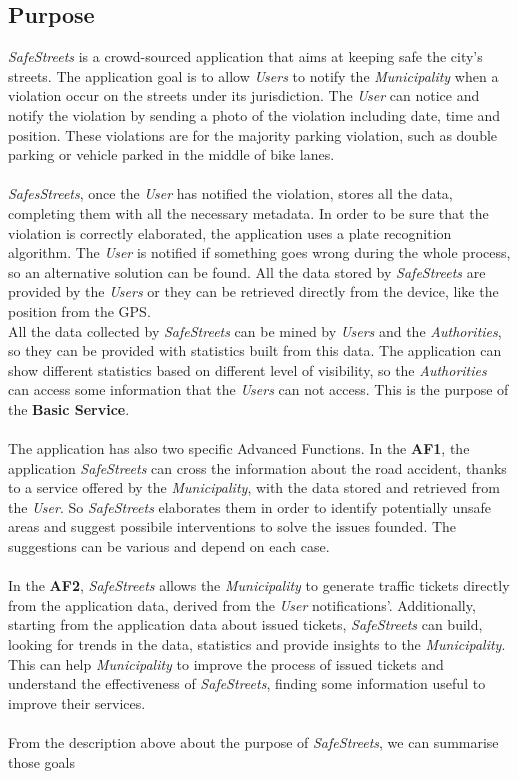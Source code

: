 \documentclass {article}
\begin{document}
	
	\subsection{Purpose}
	
	{\it SafeStreets} is a crowd-sourced application that aims at keeping safe the city's streets. The application goal is to allow {\it Users} to notify the {\it Municipality} when a violation occur on the streets under its jurisdiction. The {\it User} can notice and notify the violation by sending a photo of the violation including date, time and position. These violations are for the majority parking violation, such as double parking or vehicle parked in the middle of bike lanes. \\ \\
	{\it SafesStreets}, once the {\it User} has notified the violation, stores all the data, completing them with all the necessary metadata. In order to be sure that the violation is correctly elaborated, the application uses a plate recognition algorithm. The {\it User} is notified if something goes wrong during the whole process, so an alternative solution can be found. All the data stored by {\it SafeStreets} are provided by the {\it Users} or they can be retrieved directly from the device, like the position from the GPS.\\
	All the data collected by {\it SafeStreets} can be mined by {\it Users} and the {\it Authorities}, so they can be provided with statistics built from this data. The application can show different statistics based on different level of visibility, so the {\it Authorities} can access some information that the {\it Users} can not access. This is the purpose of the {\bf Basic Service}. \\ \\
	The application has also two specific Advanced Functions. In the {\bf AF1}, the application {\it SafeStreets} can cross the information about the road accident, thanks to a service offered by the {\it Municipality}, with the data stored and retrieved from the {\it User}. So {\it SafeStreets} elaborates them in order to identify potentially unsafe areas and suggest possibile interventions to solve the issues founded. The suggestions can be various and depend on each case. \\ \\
	In the   {\bf AF2}, {\it SafeStreets} allows the {\it Municipality} to generate traffic tickets directly from the application data, derived from the {\it User} notifications'. Additionally, starting from the application data about issued tickets, {\it SafeStreets} can build, looking for trends in the data, statistics and provide insights to the {\it Municipality}. This can help {\it Municipality} to improve the process of issued tickets and understand the effectiveness of {\it SafeStreets}, finding some information useful to improve their services. \\ \\
	From the description above about the purpose of {\it SafeStreets}, we can summarise those goals
		
\end{document}
